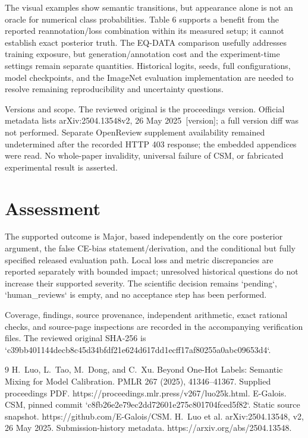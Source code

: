 \documentclass[10pt]{article}
\begin{document}
The visual examples show semantic transitions, but appearance alone is not an oracle for numerical class probabilities. Table 6 supports a benefit from the reported reannotation/loss combination within its measured setup; it cannot establish exact posterior truth. The EQ-DATA comparison usefully addresses training exposure, but generation/annotation cost and the experiment-time settings remain separate quantities. Historical logits, seeds, full configurations, model checkpoints, and the ImageNet evaluation implementation are needed to resolve remaining reproducibility and uncertainty questions.\par
Versions and scope. The reviewed original is the proceedings version. Official metadata lists arXiv:2504.13548v2, 26 May 2025 [version]; a full version diff was not performed. Separate OpenReview supplement availability remained undetermined after the recorded HTTP 403 response; the embedded appendices were read. No whole-paper invalidity, universal failure of CSM, or fabricated experimental result is asserted.\par
\section*{Assessment}
The supported outcome is Major, based independently on the core posterior argument, the false CE-bias statement/derivation, and the conditional but fully specified released evaluation path. Local loss and metric discrepancies are reported separately with bounded impact; unresolved historical questions do not increase their supported severity. The scientific decision remains `pending`, `human\_reviews` is empty, and no acceptance step has been performed.\par
Coverage, findings, source provenance, independent arithmetic, exact rational checks, and source-page inspections are recorded in the accompanying verification files. The reviewed original SHA-256 is `c39bb401144decb8c45d34bfdf21e624d617dd1ecff17af80255a0abc09653d4`.\par
9 H. Luo, L. Tao, M. Dong, and C. Xu. Beyond One-Hot Labels: Semantic Mixing for Model Calibration. PMLR 267 (2025), 41346–41367. Supplied proceedings PDF. https://proceedings.mlr.press/v267/luo25k.html. E-Galois. CSM, pinned commit `c8fb26e2e79ec2dd72601e275c801704fced5f82`. Static source snapshot. https://github.com/E-Galois/CSM. H. Luo et al. arXiv:2504.13548, v2, 26 May 2025. Submission-history metadata. https://arxiv.org/abs/2504.13548.\par
\end{document}
